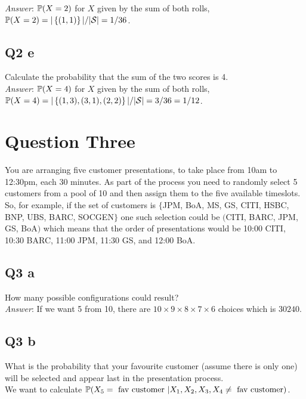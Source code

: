 \documentclass{article}
\begin{document}
            \textit{Answer}: $\mathbb{P}(X = 2)$ for $X$ given by the sum of both rolls, $\mathbb{P}(X = 2) = |\left\{ (1,1) \right\}|/|\mathcal{S}| = 1/36$.

        \subsection{Q2 e}
            Calculate the probability that the sum of the two scores is 4.\\

            \textit{Answer}: $\mathbb{P}(X = 4)$ for $X$ given by the sum of both rolls, $\mathbb{P}(X = 4) = |\left\{ (1,3),(3,1),(2,2) \right\}|/|\mathcal{S}| = 3/36 = 1/12$.

    \section{Question Three}
        You are arranging five customer presentations, to take place from 10am to 12:30pm, each 30 minutes. As part of the process you need to randomly select 5 customers from a pool of 10 and then assign them to the five available timeslots. So, for example, if the set of customers is $\{$JPM, BoA, MS, GS, CITI, HSBC, BNP, UBS, BARC, SOCGEN$\}$ one such selection could be $($CITI, BARC, JPM, GS, BoA$)$ which means that the order of presentations would be 10:00 CITI, 10:30 BARC, 11:00 JPM, 11:30 GS, and 12:00 BoA.
    
        \subsection{Q3 a}
            How many possible configurations could result?\\

            \textit{Answer}: If we want 5 from 10, there are $10 \times 9 \times 8 \times 7 \times 6$ choices which is $30240$.

        \subsection{Q3 b}
            What is the probability that your favourite customer (assume there is only one) will be selected and appear last in the presentation process.\\

            \ans We want to calculate $\mathbb{P}(X_5 = \text{ fav customer } | X_1, X_2, X_3, X_4 \neq \text{ fav customer})$.\\
            
\end{document}
